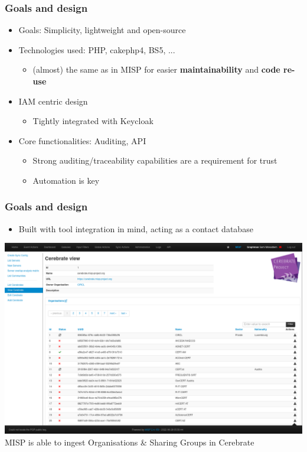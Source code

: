 \begin{frame}
\frametitle{Goals and design}
    \begin{itemize}
        \item Goals: Simplicity, lightweight and open-source
        \item Technologies used: PHP, cakephp4, BS5, ...
            \begin{itemize}
                \item (almost) the same as in MISP for easier \textbf{maintainability} and \textbf{code re-use}
            \end{itemize}
        \item IAM centric design
            \begin{itemize}
                \item Tightly integrated with Keycloak
            \end{itemize}
        \item Core functionalities: Auditing, API
            \begin{itemize}
                \item Strong auditing/traceability capabilities are a requirement for trust
                \item Automation is key
            \end{itemize}
    \end{itemize}
\end{frame}

\begin{frame}
\frametitle{Goals and design}
    \begin{itemize}
        \item Built with tool integration in mind, acting as a contact database
    \end{itemize}
    \begin{center}
        \includegraphics[width=0.85\linewidth]{pictures/misp-cerebrate.png}\\

        MISP is able to ingest Organisations \& Sharing Groups in Cerebrate
    \end{center}
\end{frame}

